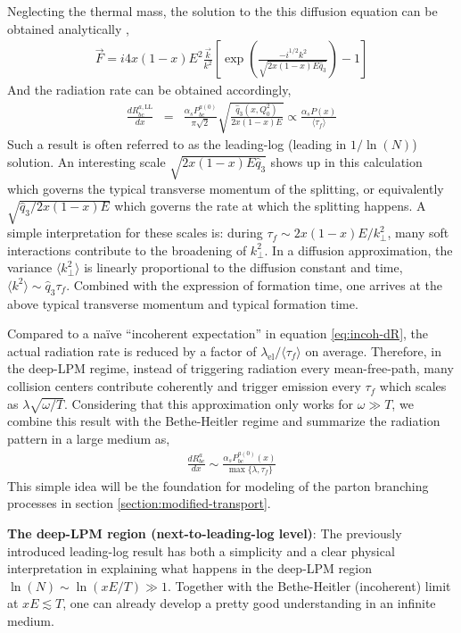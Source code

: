 Neglecting the thermal mass, the solution to the this diffusion equation can be obtained analytically \cite{Arnold:2008zu},
\begin{eqnarray}
\vec{F} = i 4x(1-x)E^2 \frac{\vec{k}}{k^2} \left[\exp\left(\frac{-i^{1/2}k^2}{\sqrt{2x(1-x)E\hat{q}_3}}\right)-1\right]
\end{eqnarray}
And the radiation rate can be obtained accordingly,
\begin{eqnarray}\label{eq:AMY-LL}
\frac{dR_{bc}^{a,\textrm{LL}}}{dx} &=& \frac{\alpha_s P_{bc}^{a(0)}}{\pi\sqrt{2}}
\sqrt{\frac{\hat{q}_3(x, Q_0^2)}{2x(1-x)E}} \propto \frac{\alpha_s P(x)}{\langle \tau_f \rangle}
\end{eqnarray}
Such a result is often referred to as the leading-log (leading in $1/\ln(N)$) solution.
An interesting scale $\sqrt{2x(1-x)E\hat{q}_3}$ shows up in this calculation which governs the typical transverse momentum of the splitting, or equivalently $\sqrt{\hat{q}_3/2x(1-x)E}$ which governs the rate at which the splitting happens.
A simple interpretation for these scales is:
during $\tau_f \sim 2x(1-x)E/k_\perp^2$, many soft interactions contribute to the broadening of $k_\perp^2$.
In a diffusion approximation, the variance $\langle k_\perp^2 \rangle$ is linearly proportional to the diffusion constant and time, $\langle k^2\rangle \sim \hat{q}_3\tau_f$.
Combined with the expression of formation time, one arrives at the above typical transverse momentum and typical formation time.

Compared to a na\"ive ``incoherent expectation'' in equation \ref{eq:incoh-dR}, the actual radiation rate is reduced by a factor of $\lambda_{\textrm{el}}/\langle \tau_f \rangle$ on average. 
Therefore, in the deep-LPM regime, instead of triggering radiation every mean-free-path, many collision centers contribute coherently and trigger emission every $\tau_f$ which scales as $\lambda \sqrt{\omega/T}$.
Considering that this approximation only works for $\omega \gg T$, we combine this result with the Bethe-Heitler regime and summarize the radiation pattern in a large medium as,
\begin{eqnarray}
\frac{dR^a_{bc}}{dx} \sim \frac{\alpha_s P^{a(0)}_{bc}(x)}{\max\{\lambda, \tau_f\}}
\end{eqnarray}
This simple idea will be the foundation for modeling of the parton branching processes in section \ref{section:modified-transport}.

{\bf The deep-LPM region (next-to-leading-log level)}:
The previously introduced leading-log result has both a simplicity and a clear physical interpretation in explaining what happens in the deep-LPM region $\ln(N) \sim \ln(xE/T) \gg 1$.
Together with the Bethe-Heitler (incoherent) limit at $xE \lesssim T$, one can already develop a pretty good understanding in an infinite medium.

